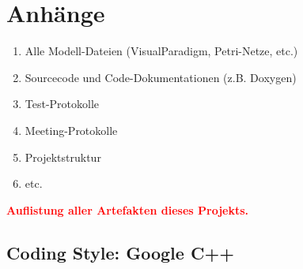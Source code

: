 \documentclass[oneside,a4paper,titlepage]{scrartcl} %
\begin{document}
\section{Anhänge}
\begin{enumerate}
 \item Alle Modell-Dateien (VisualParadigm, Petri-Netze, etc.)
 \item Sourcecode und Code-Dokumentationen (z.B. Doxygen)
 \item Test-Protokolle
 \item Meeting-Protokolle
 \item Projektstruktur
 \item etc.
\end{enumerate}
\textcolor{red}{\textbf{Auflistung aller Artefakten dieses Projekts.}}

\newpage

\subsection{Coding Style: Google C++}

\end{document}
